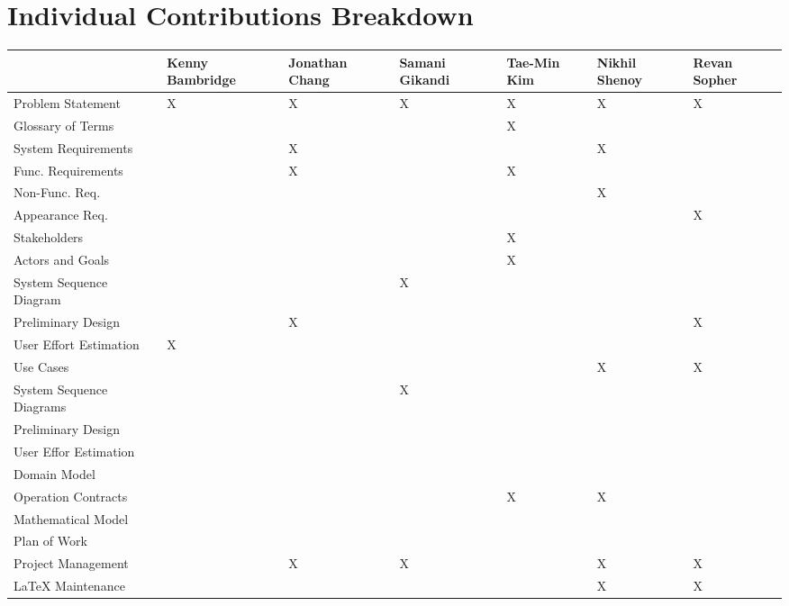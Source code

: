 \documentclass[letterpaper,english, 12pt]{scrreprt}
\begin{document}
\chapter*{Individual Contributions Breakdown}
\begin{center}
	\begin{tabular}{|l|C{2cm}|C{1.5cm}|C{1.5cm}|C{1.5cm}|C{1.5cm}|C{1.5cm}|}
		\hline
			&	Kenny Bambridge		&	Jonathan Chang		&	Samani Gikandi		&	Tae-Min Kim	&	  Nikhil Shenoy		&	Revan Sopher\\ \hline
Problem Statement	&		X		&		X		&		X		&		X	&		X		&	X	    \\ \hline
Glossary of Terms	&				&				&				&		X	&				&      		\\ \hline
System Requirements	&				&		X		&				&			&		X		&		\\ \hline
Func. Requirements	&				&		X		&				&		X	&				&		\\ \hline
Non-Func. Req.		&				&				&				&			&		X		&		\\ \hline
Appearance Req.		&				&				&				&			&				&		X\\ \hline
Stakeholders		&				&				&				&		X	&				&		 \\ \hline
Actors and Goals	&				&				&				&		X	&				&		 \\ \hline
System Sequence Diagram &				&				&		X		&			&				&		 \\ \hline
Preliminary Design	&				&		X		&				&			&				&	X	 \\ \hline
User Effort Estimation  &		X		&				&				&			&				&		 \\ \hline
Use Cases		&				&				&				&			&		X		&	X	 \\ \hline
System Sequence Diagrams&		  		&				&		X		&			&				&		 \\ \hline
Preliminary Design	&				&				&				&			&				&		 \\ \hline
User Effor Estimation	&				&				&				&			&				&		 \\ \hline
Domain Model		&				&				&				&			&				&		 \\ \hline
Operation Contracts	&				&				&				&		X	&		X		&		 \\ \hline
Mathematical Model	&				&				&				&			&				&		 \\ \hline
Plan of Work		&				&				&				&			&				&		 \\ \hline
Project Management	&				&		X		&		X		&			&		X		&		X\\ \hline
LaTeX Maintenance	&				&				&				&			&		X		&		X\\ \hline
	\end{tabular}
\end{center}
\end{document}
